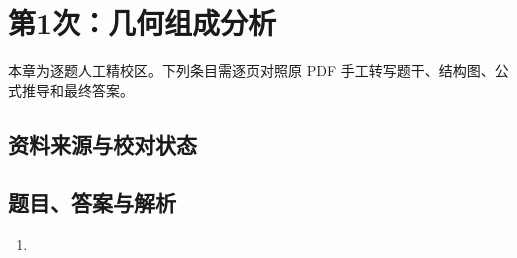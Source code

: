 \chapter{第1次：几何组成分析}

本章为逐题人工精校区。下列条目需逐页对照原 PDF 手工转写题干、结构图、公式推导和最终答案。

\section{资料来源与校对状态}


\section{题目、答案与解析}

\begin{enumerate}[label=\textbf{第\arabic*题},wide]
  \item
  \begin{problemBox}
  \end{problemBox}

  \begin{solutionBox}
  \end{solutionBox}
\end{enumerate}
